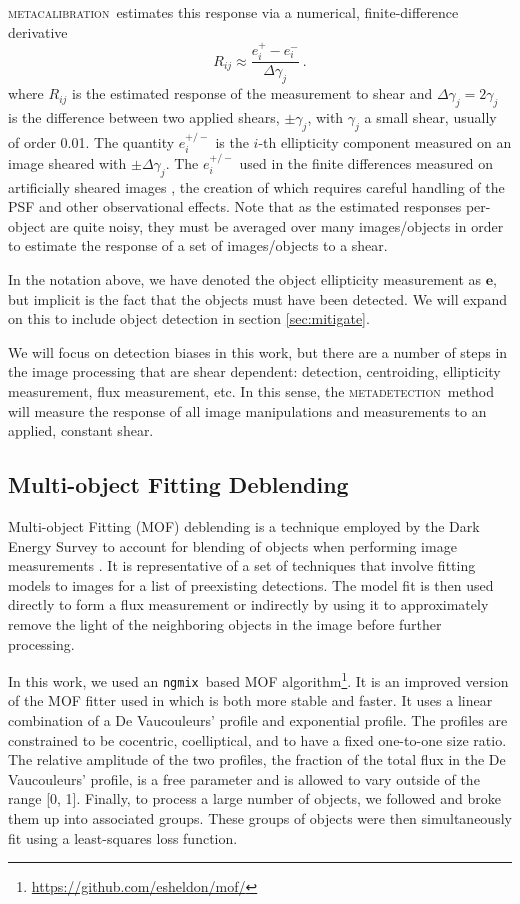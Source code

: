 \documentclass[fleqn,useAMS,usenatbib]{mnras}
\newcommand{\ngmix}{\texttt{ngmix}}
\newcommand{\mcal}{\textsc{metacalibration}}
\newcommand{\mdet}{\textsc{metadetection}}
\begin{document}
\mcal\ estimates this response via a numerical, finite-difference derivative
\begin{displaymath}
R_{ij} \approx \frac{e_i^{+} - e_i^{-}}{\Delta\gamma_j}\ .
\end{displaymath}
where $R_{ij}$ is the estimated response of the measurement to shear and
$\Delta\gamma_j = 2 \gamma_j$ is the difference between two applied shears,
$\pm \gamma_j$, with $\gamma_j$ a small shear, usually of order 0.01. The
quantity $e_i^{+/-}$ is the $i$-th ellipticity component measured on an image
sheared with $\pm\Delta\gamma_j$.  The $e_i^{+/-}$ used in the finite
differences measured on artificially sheared images \citep{SheldonMcal2017},
the creation of which requires careful handling of the PSF and other
observational effects.  Note that as the estimated responses per-object are
quite noisy, they must be averaged over many images/objects in order to
estimate the response of a set of images/objects to a shear.

In the notation above, we have denoted the object ellipticity measurement as
$\boldsymbol{e}$, but implicit is the fact that the objects must have been
detected.  We will expand on this to include object detection in section
\ref{sec:mitigate}.

We will focus on detection biases in this work, but there are a number of steps
in the image processing that are shear dependent: detection, centroiding,
ellipticity measurement, flux measurement, etc.  In this sense, the \mdet\
method will measure the response of all image manipulations and measurements to
an applied, constant shear.

\subsection{Multi-object Fitting Deblending}

Multi-object Fitting (MOF) deblending is a technique employed by the Dark
Energy Survey to account for blending of objects when performing image
measurements \citep{DESY1cat}. It is representative of a set of techniques that
involve fitting models to images for a list of preexisting detections. The
model fit is then used directly to form a flux measurement or indirectly by
using it to approximately remove the light of the neighboring objects in the
image before further processing.

In this work, we used an \ngmix\ based MOF
algorithm\footnote{\url{https://github.com/esheldon/mof/}}. It is an improved
version of the MOF fitter used in \cite{DESY1cat} which is
both more stable and faster. It uses a linear combination of a De Vaucouleurs'
\citep{devauc1948} profile and exponential profile. The profiles are
constrained to be cocentric, coelliptical, and to have a fixed one-to-one size
ratio.  The relative amplitude of the two profiles, the fraction of the total
flux in the De Vaucouleurs' profile, is a free parameter and is allowed to vary
outside of the range [0, 1]. Finally, to process a large number of objects, we
followed \citet{DESY1cat} and broke them up into associated groups.  These
groups of objects were then simultaneously fit using a least-squares loss
function.
\end{document}
